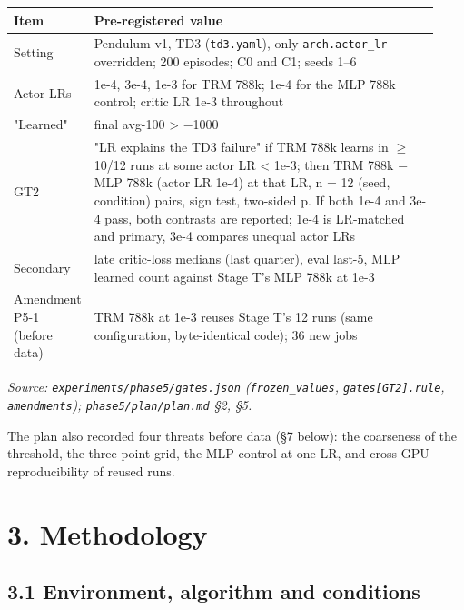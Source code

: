 \documentclass[11pt]{article}
\begin{document}
\begin{center}\small\begin{tabular}{>{\raggedright\arraybackslash}p{0.119\linewidth}>{\raggedright\arraybackslash}p{0.815\linewidth}}
\toprule
Item & Pre-registered value \\
\midrule
Setting & Pendulum-v1, TD3 (\texttt{td3.yaml}), only \texttt{arch.actor\_lr} overridden; 200 episodes; C0 and C1; seeds 1--6 \\
Actor LRs & 1e-4, 3e-4, 1e-3 for TRM 788k; 1e-4 for the MLP 788k control; critic LR 1e-3 throughout \\
"Learned" & final avg-100 > $-$1000 \\
GT2 & "LR explains the TD3 failure" if TRM 788k learns in $\geq$ 10/12 runs at some actor LR < 1e-3; then TRM 788k $-$ MLP 788k (actor LR 1e-4) at that LR, n = 12 (seed, condition) pairs, sign test, two-sided p. If both 1e-4 and 3e-4 pass, both contrasts are reported; 1e-4 is LR-matched and primary, 3e-4 compares unequal actor LRs \\
Secondary & late critic-loss medians (last quarter), eval last-5, MLP learned count against Stage T's MLP 788k at 1e-3 \\
Amendment P5-1 (before data) & TRM 788k at 1e-3 reuses Stage T's 12 runs (same configuration, byte-identical code); 36 new jobs \\
\bottomrule
\end{tabular}\end{center}



\emph{Source: \texttt{experiments/\allowbreak{}phase5/\allowbreak{}gates.\allowbreak{}json} (\texttt{frozen\_values}, \texttt{gates[GT2].\allowbreak{}rule}, \texttt{amendments}); \texttt{phase5/\allowbreak{}plan/\allowbreak{}plan.\allowbreak{}md} \S{}2, \S{}5.}



The plan also recorded four threats before data (\S{}7 below): the coarseness of the threshold, the three-point grid, the MLP control at one LR, and cross-GPU reproducibility of reused runs.



\section*{3. Methodology}



\subsection*{3.1 Environment, algorithm and conditions}
\end{document}

